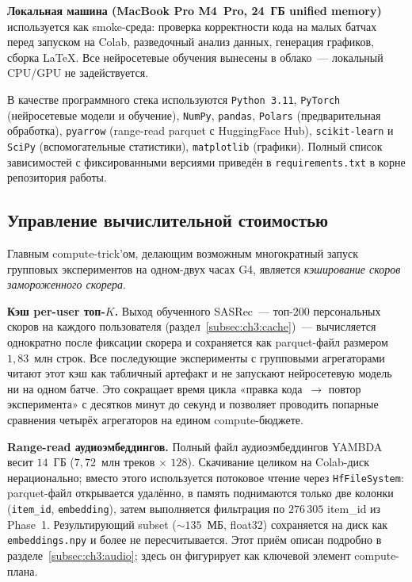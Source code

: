 \textbf{Локальная машина (MacBook Pro M4~Pro, 24~ГБ unified memory)} используется как smoke-среда: проверка корректности кода на малых батчах перед запуском на Colab, разведочный анализ данных, генерация графиков, сборка LaTeX. Все нейросетевые обучения вынесены в облако~--- локальный CPU/GPU не задействуется.

В качестве программного стека используются \texttt{Python~3.11}, \texttt{PyTorch} (нейросетевые модели и обучение), \texttt{NumPy}, \texttt{pandas}, \texttt{Polars} (предварительная обработка), \texttt{pyarrow} (range-read parquet с HuggingFace Hub), \texttt{scikit-learn} и \texttt{SciPy} (вспомогательные статистики), \texttt{matplotlib} (графики). Полный список зависимостей с фиксированными версиями приведён в \texttt{requirements.txt} в корне репозитория работы.

\subsection{Управление вычислительной стоимостью}\label{subsec:ch3:compute-cost}

Главным compute-trick'ом, делающим возможным многократный запуск групповых экспериментов на одном-двух часах G4, является \emph{кэширование скоров замороженного скорера}.

\textbf{Кэш per-user топ-$K$.} Выход обученного SASRec~--- топ-$200$ персональных скоров на каждого пользователя (раздел~\ref{subsec:ch3:cache})~--- вычисляется однократно после фиксации скорера и сохраняется как parquet-файл размером $1{,}83$~млн строк. Все последующие эксперименты с групповыми агрегаторами читают этот кэш как табличный артефакт и не запускают нейросетевую модель ни на одном батче. Это сокращает время цикла «правка кода~$\to$ повтор эксперимента» с десятков минут до секунд и позволяет проводить попарные сравнения четырёх агрегаторов на едином compute-бюджете.

\textbf{Range-read аудиоэмбеддингов.} Полный файл аудиоэмбеддингов YAMBDA весит $14$~ГБ ($7{,}72$~млн треков $\times$ $128$). Скачивание целиком на Colab-диск нерационально; вместо этого используется потоковое чтение через \texttt{HfFileSystem}: parquet-файл открывается удалённо, в память поднимаются только две колонки (\texttt{item\_id}, \texttt{embedding}), затем выполняется фильтрация по $276\,305$ item\_id из Phase~1. Результирующий subset ($\sim$$135$~МБ, float32) сохраняется на диск как \texttt{embeddings.npy} и более не пересчитывается. Этот приём описан подробно в разделе~\ref{subsec:ch3:audio}; здесь он фигурирует как ключевой элемент compute-плана.

